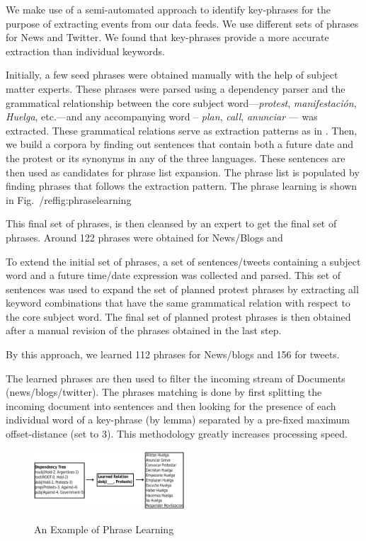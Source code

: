 We make use of a semi-automated approach to identify key-phrases for the purpose of extracting events from our data feeds. We use different sets of phrases for News and Twitter. We found that key-phrases provide a more accurate extraction than individual keywords.

Initially, a few seed phrases were obtained manually
with the help of subject matter experts. These phrases were parsed
using a dependency parser and the grammatical relationship between the
core subject word---{\em protest}, {\em manifestación}, {\em Huelga},
etc.---and any accompanying word -- {\em plan}, {\em call}, {\em anunciar} --- was extracted. These grammatical relations serve as extraction patterns as in \cite{riloff2003learning}. Then, we build a corpora by finding out sentences that contain both a future date and the protest or its synonyms in any of the three languages. These sentences are then used as candidates for phrase list expansion. The phrase list is populated by finding phrases that follows the extraction pattern.
The phrase learning is shown in Fig.~/ref{fig:phraselearning}

This final set of phrases, is then cleansed by an expert to get the final set of phrases. Around 122 phrases were obtained for News/Blogs and 

To extend the initial set of phrases, a set of sentences/tweets containing a subject word and a
future time/date expression was collected and parsed.  This set of
sentences was used to expand the set of planned protest phrases by
extracting all keyword combinations that have the same grammatical
relation with respect to the core subject word. The final set of
planned protest phrases is then obtained after a manual revision of
the phrases obtained in the last step.

By this approach, we learned 112 phrases for News/blogs and 156 for tweets.

The learned phrases are then used to filter the incoming stream of Documents (news/blogs/twitter). The phrases matching is done by first splitting the incoming document into sentences and then looking for the presence of each individual word of a key-phrase (by lemma) separated by a pre-fixed maximum offset-distance (set to 3). This methodology greatly increases processing speed.

\begin{figure}
\caption{An Example of Phrase Learning}
\includegraphics[width=0.5\textwidth]{figures/phraseLearning}
\label{fig:phraseLearning}
\end{figure}
